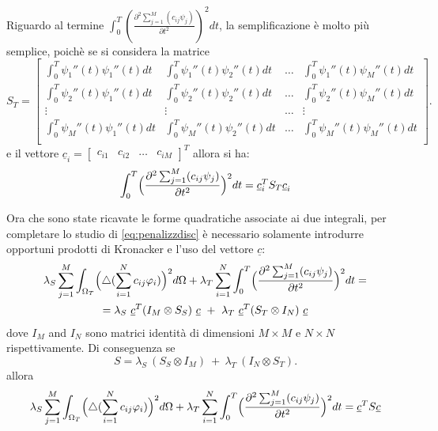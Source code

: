 \documentclass[a4paper,11pt,twoside,openright]{book}							%
\begin{document}
Riguardo al termine $\int_0^T (\frac{\partial^2 \sum_{j=1}^M(c_{ij}\psi_j) }{\partial t ^2} )^2 dt$, la semplificazione è molto più semplice, poichè se si considera la matrice
 $$ S_T = \begin{bmatrix}
\int_0^T \psi_1''(t) \psi_1''(t) dt  & \int_0^T \psi_1''(t) \psi_2''(t) dt & \hdots & \int_0^T \psi_1''(t) \psi_M''(t) dt  \\
\int_0^T \psi_2''(t) \psi_1''(t) dt  & \int_0^T \psi_2''(t) \psi_2''(t) dt & \hdots & \int_0^T \psi_2''(t) \psi_M''(t) dt  \\
\vdots & \vdots & \hdots & \vdots \\
\int_0^T \psi_M''(t) \psi_1''(t) dt  & \int_0^T \psi_M''(t) \psi_2''(t) dt & \hdots & \int_0^T \psi_M''(t) \psi_M''(t) dt  \\
\end{bmatrix} .$$
e il vettore $
\underline c_i =
\begin{bmatrix}
c_{i1} & c_{i2} & \hdots & c_{iM}
\end{bmatrix}^T$ allora si ha:
$$
\int_0^T \Bigl( \frac{\partial^2 \sum_{j=1}^M(c_{ij}\psi_j) }{\partial t ^2} \Bigr)^2 dt =\underline c_i^T  S_T \underline c_i
$$

Ora che sono state ricavate le forme quadratiche associate ai due integrali, per completare lo studio di \ref{eq:penalizzdisc} è necessario solamente introdurre opportuni prodotti di Kronacker e l'uso del vettore $\underline c$:
\begin{multline*}
\lambda_S  \sum_{j=1}^M \int_{\Omega_T} \Bigl( \triangle(\sum_{i=1}^N  c_{ij}\varphi_i ) \Bigr)^2 d \Omega + \lambda_T \sum_{i=1}^N\int_0^T \Bigl( \frac{\partial^2 \sum_{j=1}^M(c_{ij}\psi_j) }{\partial t ^2} \Bigr)^2 dt= \\
= \lambda_S\   \underline c^T (I_M \otimes S_S)\  \underline c   \ +\  \lambda_T\  \underline c^T ( S_T \otimes I_N)\  \underline c
\end{multline*}
dove $I_M$ and $I_N$ sono matrici identità di dimensioni $M \times M$ e $N \times N$ rispettivamente.
Di conseguenza se
$$ S = \lambda_S\    (S_S \otimes I_M)   \ +\  \lambda_T\   (I_N \otimes S_T)  .$$
allora
$$
\lambda_S  \sum_{j=1}^M \int_{\Omega_T} \Bigl( \triangle(\sum_{i=1}^N  c_{ij}\varphi_i ) \Bigr)^2 d \Omega + \lambda_T \sum_{i=1}^N\int_0^T \Bigl( \frac{\partial^2 \sum_{j=1}^M(c_{ij}\psi_j) }{\partial t ^2} \Bigr)^2 dt=\underline c^T S \underline c
$$
\end{document}
